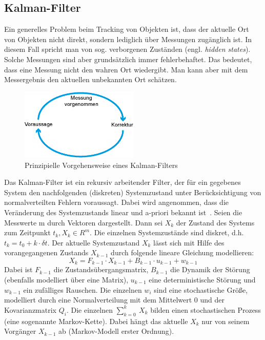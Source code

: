 \documentclass[a4paper, 11pt, twocolumn]{article}
\begin{document}

\subsection{Kalman-Filter} %
\label{sub:kalman_filter}

Ein generelles Problem beim Tracking von Objekten ist, dass der aktuelle Ort von Objekten nicht direkt, sondern lediglich über Messungen zugänglich ist. In diesem Fall spricht man von sog. verborgenen Zuständen (engl. \emph{hidden states}). Solche Messungen sind aber grundsätzlich immer fehlerbehaftet. Das bedeutet, dass eine Messung nicht den wahren Ort wiedergibt. Man kann aber mit dem Messergebnis den aktuellen unbekannten Ort schätzen.

\begin{figure}[htpb]
	\centering
	\includegraphics[width=0.5\textwidth]{kalman.eps}
	\caption{Prinzipielle Vorgehensweise eines Kalman-Filters}
	\label{fig:kalman}
\end{figure}

Das Kalman-Filter ist ein rekursiv arbeitender Filter, der für ein gegebenes System den nachfolgenden (diskreten) Systemzustand unter Berücksichtigung von normalverteilten Fehlern voraussagt. Dabei wird angenommen, dass die Veränderung des Systemzustands linear und a-priori bekannt ist~\cite{Welch1995}. Seien die Messwerte m durch Vektoren dargestellt. Dann sei $X_k$ der Zustand des Systems zum Zeitpunkt $t_k, X_k \in R^m$. Die einzelnen Systemzustände sind diskret, d.h. $t_k = t_0 + k \cdot \delta t$. Der aktuelle Systemzustand $X_k$ lässt sich mit Hilfe des vorangegangenen Zustands $X_{k-1}$ durch folgende lineare Gleichung modellieren:
\[
	X_k = F_{k-1} \cdot X_{k-1} + B_{k-1} \cdot u_{k-1} + w_{k-1}
\]
Dabei ist $F_{k-1}$ die Zustandsübergangsmatrix, $B_{k-1}$ die Dynamik der Störung (ebenfalls modelliert über eine Matrix), $u_{k-1}$ eine deterministische Störung und $w_{k-1}$ ein zufälliges Rauschen. Die einzelnen $w_i$ sind eine stochastische Größe, modelliert durch eine Normalverteilung mit dem Mittelwert 0 und der Kovarianzmatrix $Q_i$. Die einzelnen $\sum_{k=0}^k~X_k$ bilden einen stochastischen Prozess (eine sogenannte Markov-Kette). Dabei hängt das aktuelle $X_k$ nur von seinem Vorgänger $X_{k-1}$ ab (Markov-Modell erster Ordnung).
\end{document}

